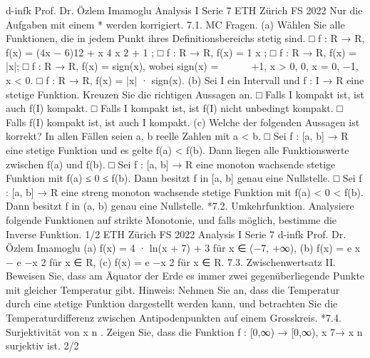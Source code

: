 d-infk
Prof. Dr. Özlem Imamoglu
Analysis I
Serie 7
ETH Zürich
FS 2022
Nur die Aufgaben mit einem * werden korrigiert.
7.1. MC Fragen.
(a) Wählen Sie alle Funktionen, die in jedem Punkt ihres Definitionsbereichs stetig
sind.
□ f : R → R, f(x) = (4x − 6)12 + x
4
x
2 + 1
;
□ f : R → R, f(x) = 1
x
;
□ f : R → R, f(x) = |x|;
□ f : R → R, f(x) = sign(x), wobei
sign(x) =



+1, x > 0,
0, x = 0,
−1, x < 0.
□ f : R → R, f(x) = |x| · sign(x).
(b) Sei I ein Intervall und f : I → R eine stetige Funktion. Kreuzen Sie die richtigen
Aussagen an.
□ Falls I kompakt ist, ist auch f(I) kompakt.
□ Falls I kompakt ist, ist f(I) nicht unbedingt kompakt.
□ Falls f(I) kompakt ist, ist auch I kompakt.
(c) Welche der folgenden Aussagen ist korrekt? In allen Fällen seien a, b reelle
Zahlen mit a < b.
□ Sei f : [a, b] → R eine stetige Funktion und es gelte f(a) < f(b). Dann
liegen alle Funktionswerte zwischen f(a) und f(b).
□ Sei f : [a, b] → R eine monoton wachsende stetige Funktion mit f(a) ≤
0 ≤ f(b). Dann besitzt f in [a, b] genau eine Nullstelle.
□ Sei f : [a, b] → R eine streng monoton wachsende stetige Funktion mit
f(a) < 0 < f(b). Dann besitzt f in (a, b) genau eine Nullstelle.
*7.2. Umkehrfunktion. Analysiere folgende Funktionen auf strikte Monotonie, und
falls möglich, bestimme die Inverse Funktion.
1/2
ETH Zürich
FS 2022
Analysis I
Serie 7
d-infk
Prof. Dr. Özlem Imamoglu
(a) f(x) = 4 · ln(x + 7) + 3 für x ∈ (−7, +∞),
(b) f(x) = e
x − e
−x
2
für x ∈ R,
(c) f(x) = e
−x
2
für x ∈ R.
7.3. Zwischenwertsatz II. Beweisen Sie, dass am Äquator der Erde es immer zwei
gegenüberliegende Punkte mit gleicher Temperatur gibt.
Hinweis: Nehmen Sie an, dass die Temperatur durch eine stetige Funktion dargestellt
werden kann, und betrachten Sie die Temperaturdifferenz zwischen Antipodenpunkten
auf einem Grosskreis.
*7.4. Surjektivität von x
n
. Zeigen Sie, dass die Funktion
f : [0,∞) → [0,∞), x 7→ x
n
surjektiv ist.
2/2
